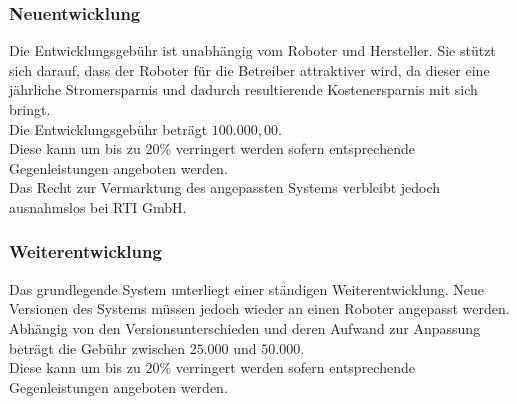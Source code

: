 \subsubsection{Neuentwicklung}
Die Entwicklungsgebühr ist unabhängig vom Roboter und Hersteller. Sie stützt sich darauf, dass der Roboter für die Betreiber attraktiver wird, da dieser eine jährliche Stromersparnis und dadurch resultierende Kostenersparnis mit sich bringt.\\
Die Entwicklungsgebühr beträgt $100.000,00$\officialeuro.\\
Diese kann um bis zu $20$\% verringert werden sofern entsprechende Gegenleistungen angeboten werden.\\
Das Recht zur Vermarktung des angepassten Systems verbleibt jedoch ausnahmslos bei \textsf{RTI GmbH}.

\subsubsection{Weiterentwicklung}
Das grundlegende System unterliegt einer ständigen Weiterentwicklung. Neue Versionen des Systems müssen jedoch wieder an einen Roboter angepasst werden. Abhängig von den Versionsunterschieden und deren Aufwand zur Anpassung beträgt die Gebühr zwischen $25.000$ und $50.000$\officialeuro.\\
Diese kann um bis zu $20$\% verringert werden sofern entsprechende Gegenleistungen angeboten werden.

